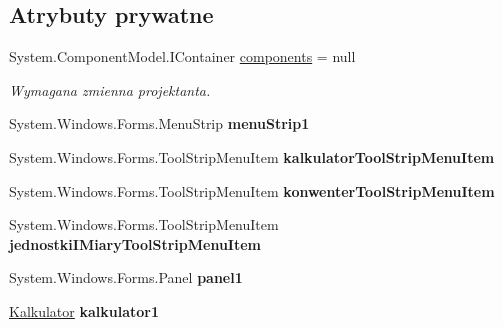 \subsection*{Atrybuty prywatne}
\begin{DoxyCompactItemize}
\item 
System.\+Component\+Model.\+I\+Container \mbox{\hyperlink{classkalku__all__in__one_1_1_form1_a6435b7f5e458b4998b1dd1be91d3773d}{components}} = null
\begin{DoxyCompactList}\small\item\em Wymagana zmienna projektanta. \end{DoxyCompactList}\item 
\mbox{\label{classkalku__all__in__one_1_1_form1_a5e75196ca4bf64650780be6303d08396}} 
System.\+Windows.\+Forms.\+Menu\+Strip {\bfseries menu\+Strip1}
\item 
\mbox{\label{classkalku__all__in__one_1_1_form1_a59cef9030c667fc032f148dc17716b71}} 
System.\+Windows.\+Forms.\+Tool\+Strip\+Menu\+Item {\bfseries kalkulator\+Tool\+Strip\+Menu\+Item}
\item 
\mbox{\label{classkalku__all__in__one_1_1_form1_a932afe829878726b435b15a425ffe61a}} 
System.\+Windows.\+Forms.\+Tool\+Strip\+Menu\+Item {\bfseries konwenter\+Tool\+Strip\+Menu\+Item}
\item 
\mbox{\label{classkalku__all__in__one_1_1_form1_ab3149c59ac9e0755c2c2586c228b01bd}} 
System.\+Windows.\+Forms.\+Tool\+Strip\+Menu\+Item {\bfseries jednostki\+I\+Miary\+Tool\+Strip\+Menu\+Item}
\item 
\mbox{\label{classkalku__all__in__one_1_1_form1_ada7e9b07d7cefbc4d2fd1fc505568fc1}} 
System.\+Windows.\+Forms.\+Panel {\bfseries panel1}
\item 
\mbox{\label{classkalku__all__in__one_1_1_form1_a2be06f1e66b8e8263646fd9c2483b1dc}} 
\mbox{\hyperlink{classkalku__all__in__one_1_1_kalkulator}{Kalkulator}} {\bfseries kalkulator1}
\item 
\mbox{\label{classkalku__all__in__one_1_1_form1_a2693799a0c98a5901a83efb678abb7f3}} 

\end{DoxyCompactItemize}
